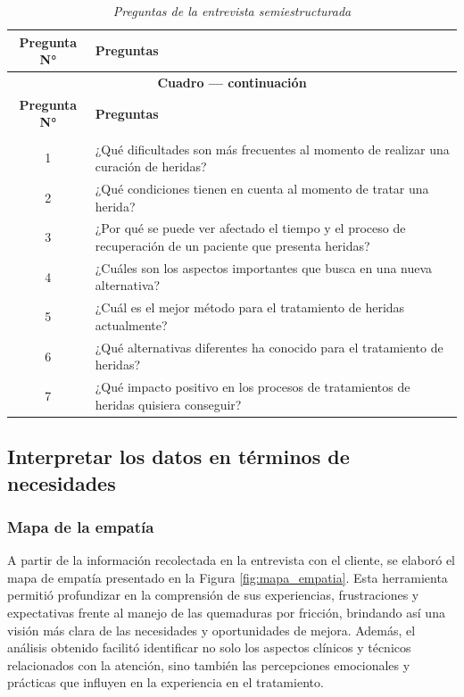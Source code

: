 \documentclass[../../DocumentoCompleto.tex]{subfiles}
\begin{document}
\begin{longtable}{c>{\RaggedRight\arraybackslash}p{11cm}}
\caption{\textit{Preguntas de la entrevista semiestructurada}}
\label{tab:preguntas_entrevista} \\

\toprule
\textbf{Pregunta N°} & \textbf{Preguntas} \\
\midrule
\endfirsthead

\multicolumn{2}{c}{\textbf{Cuadro \thetable{} — continuación}} \\ 
\toprule
\textbf{Pregunta N°} & \textbf{Preguntas} \\
\midrule
\endhead

\midrule
\multicolumn{2}{r}{\textit{}} \\
\endfoot

\bottomrule
\endlastfoot

1 & ¿Qué dificultades son más frecuentes al momento de realizar una curación de heridas? \\
2 & ¿Qué condiciones tienen en cuenta al momento de tratar una herida? \\
3 & ¿Por qué se puede ver afectado el tiempo y el proceso de recuperación de un paciente que presenta heridas? \\
4 & ¿Cuáles son los aspectos importantes que busca en una nueva alternativa? \\
5 & ¿Cuál es el mejor método para el tratamiento de heridas actualmente? \\
6 & ¿Qué alternativas diferentes ha conocido para el tratamiento de heridas? \\
7 & ¿Qué impacto positivo en los procesos de tratamientos de heridas quisiera conseguir? \\

\end{longtable}



 
  \subsection{Interpretar los datos en términos de necesidades}
  \subsubsection*{Mapa de la empatía}
  A partir de la información recolectada en la entrevista con el cliente, se elaboró el mapa de empatía presentado en la Figura \ref{fig:mapa_empatia}. Esta herramienta permitió profundizar en la comprensión de sus experiencias, frustraciones y expectativas frente al manejo de las quemaduras por fricción, brindando así una visión más clara de las necesidades y oportunidades de mejora. Además, el análisis obtenido facilitó identificar no solo los aspectos clínicos y técnicos relacionados con la atención, sino también las percepciones emocionales y prácticas que influyen en la experiencia en el tratamiento.
\end{document}
